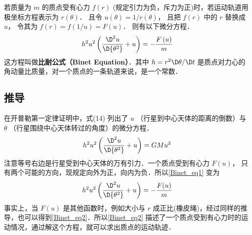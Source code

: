 
若质量为 $m$ 的质点受有心力 $f\left( r \right)$ (规定引力为负，斥力为正)时，若运动轨道用极坐标方程表示为 $r\left( \theta  \right)$． 且令 $u\left( \theta  \right) = 1/{r\left( \theta  \right)}$， 且把 $f\left( r \right)$ 中的 $r$ 替换成 $u$， 令其为
 $f\left( r \right) = f(1/u) = F\left( u \right)$． 则有以下微分方程．
 \begin{equation}
{h^2}{u^2}\left( {\frac{{{\D ^2}u}}{{\D {\theta ^2}}} + u} \right) = -\frac{{F\left( u \right)}}{m}
\end{equation} 
这方程叫做\textbf{比耐公式（Binet Equation）}．其中 $h = {r^2} {\D\theta }/{\D t}$ 是质点对力心的角动量比质量，对一个质点的一条轨道来说，是一个常数．

\subsection{推导}
在开普勒第一定律证明中，式(14)%
列出了 $u$ （行星到中心天体的距离的倒数）与 $\theta $ （行星围绕中心天体转过的角度）的微分方程． 
\begin{equation}\label{Binet_eq1}
{h^2}{u^2}\left( {\frac{{{\D ^2}u}}{{\D {\theta ^2}}} + u} \right) =  GM{u^2}
\end{equation} 
注意等号右边是行星受到中心天体的万有引力．一个质点受到有心力%
 $F\left( u \right)$， 只有两个可能的方向，现规定向外为正，向内为负．所以\autoref{Binet_eq1} 变为
\begin{equation}\label{Binet_eq2}
{h^2}{u^2}\left( {\frac{{{\D ^2}u}}{{\D {\theta ^2}}} + u} \right) = -\frac{{F(u)}}{m}
\end{equation} 
事实上，当 $F\left( u \right)$ 是其他函数时，例如大小与 $r$ 成正比(橡皮绳)，经过同样的推导，也可以得到\autoref{Binet_eq2}．所以\autoref{Binet_eq2} 描述了一个质点受到有心力时的运动情况，通过解这个方程，就可以求出质点的运动轨迹．














